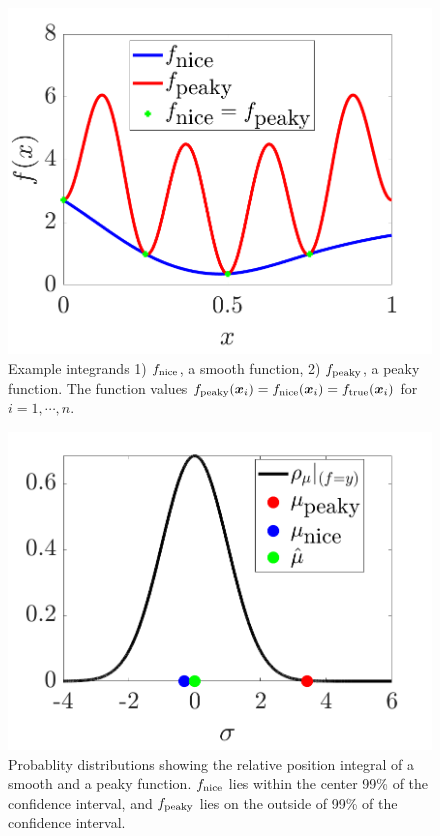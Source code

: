 \documentclass{iitthesis}          %
\newcommand{\bm}[1]{\boldsymbol{#1}}
\newcommand{\vx}{\bm{x}}
\newcommand{\NICE}{\textup{nice}}
\newcommand{\PEAKY}{\textup{peaky}}
\newcommand{\TRUE}{\textup{true}}
\newcommand{\JRNote}[1]{}
\begin{document}
\begin{figure}[ht]
	\centering
	\includegraphics[width=0.9\linewidth]{cone_bayes_f_real}
	\caption{Example integrands 1) $f_{\NICE}$, a smooth function, 2) $f_{\PEAKY}$, a peaky function. The function values $f_{\PEAKY}(\vx_i) = f_{\NICE}(\vx_i) = f_{\TRUE}(\vx_i) $ for $i=1, \cdots, n$.}
	\label{fig:cone_bayes_functions}
\end{figure}
\begin{figure}[ht]
	\centering
	\includegraphics[width=0.9\linewidth]{cone_bayes_mu_pdf}
	\caption{Probablity distributions showing the relative position integral of a smooth and a peaky function. $f_{\NICE}$ lies within the center 99\% of the confidence interval, and $f_{\PEAKY}$ lies on the outside of 99\% of  the confidence interval.}
	\label{fig:cone_bayes_posterior}
\end{figure}
\end{document}

